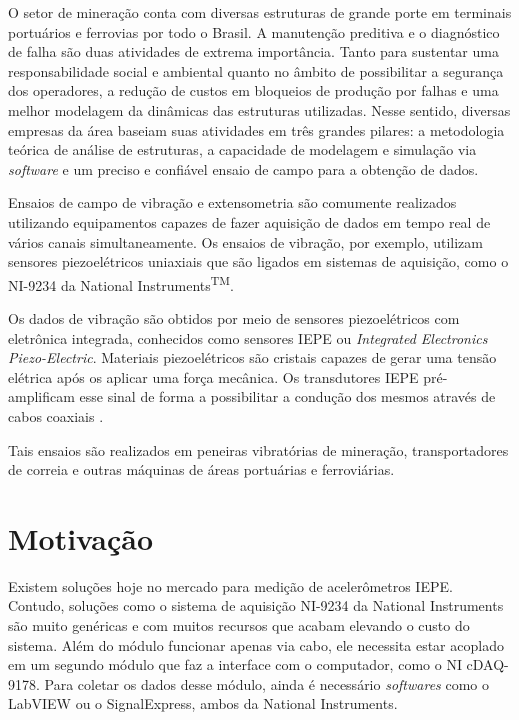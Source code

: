 \documentclass[
	12pt,				%
	openright,			%
	twoside,			%
	a4paper,			%
	english,			%
	french,				%
	spanish,			%
	brazil,				%
	]{abntex2}
\begin{document}
		O setor de mineração conta com diversas estruturas de grande porte em
		terminais portuários e ferrovias por todo o Brasil. A manutenção
		preditiva e o diagnóstico de falha são duas atividades de extrema
		importância. Tanto para sustentar uma responsabilidade social e ambiental quanto no âmbito de possibilitar a segurança dos operadores, a redução de custos em bloqueios de produção por falhas e uma melhor modelagem da dinâmicas das estruturas utilizadas. Nesse sentido,
		diversas empresas da área baseiam suas atividades em três grandes
		pilares: a metodologia teórica de análise de estruturas, a capacidade de
		modelagem e simulação via \textit{software} e um preciso e confiável
		ensaio de campo para a obtenção de dados.
		
		Ensaios de campo de vibração e extensometria são comumente realizados
		utilizando equipamentos capazes de fazer aquisição de dados em tempo
		real de vários canais simultaneamente. Os ensaios de vibração, por
		exemplo, utilizam sensores piezoelétricos uniaxiais que são ligados em
		sistemas de aquisição, como o NI-9234 da National
		Instruments\textsuperscript{TM}.
		
		Os dados de vibração são obtidos por meio de sensores piezoelétricos com
		eletrônica integrada, conhecidos como sensores IEPE ou \textit{Integrated
		Electronics Piezo-Electric}. Materiais piezoelétricos são cristais capazes de
		gerar uma tensão elétrica após os aplicar uma força mecânica.
		Os transdutores IEPE pré-amplificam esse sinal de forma a possibilitar a
		condução dos mesmos através de cabos coaxiais \cite{iepeCircuit}.

		Tais ensaios são realizados em peneiras vibratórias de mineração,
		transportadores de correia e outras máquinas de áreas portuárias e ferroviárias.
	\section{Motivação}

		Existem soluções hoje no mercado para medição de acelerômetros IEPE. Contudo, soluções como o sistema de aquisição NI-9234 da National Instruments são muito genéricas e com muitos recursos que acabam elevando o custo do sistema. Além do módulo funcionar apenas via cabo, ele necessita estar acoplado em um segundo módulo que faz a interface com o computador, como o NI cDAQ-9178. Para coletar os dados desse módulo, ainda é necessário \textit{softwares} como o LabVIEW ou o SignalExpress, ambos da National Instruments. 
		
\end{document}
